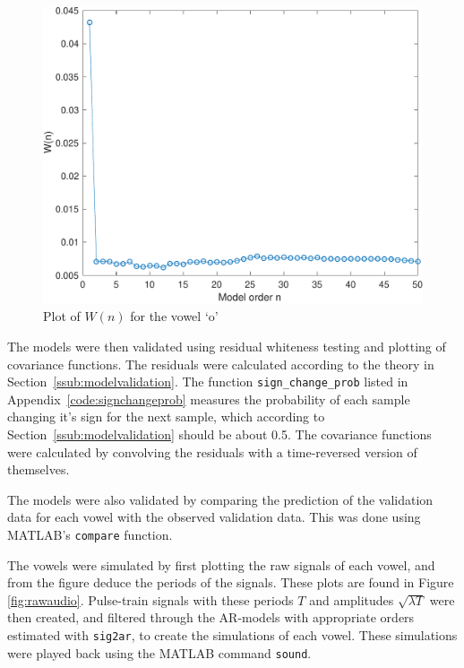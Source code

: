 \documentclass{IEEEtran}
\newcommand{\code}[1]{\texttt{#1}}
\begin{document}
\begin{figure}[h!]
    \centering
    \captionsetup{justification=centering}
    \includegraphics[width=0.8\columnwidth]{pictures/wno.pdf}
    \caption{Plot of $W(n)$ for the vowel `o'}
    \label{fig:wno}
\end{figure}

The models were then validated using residual whiteness testing and plotting of
covariance functions. The residuals were calculated according to the theory in
Section~\ref{ssub:modelvalidation}. The function \code{sign\_change\_prob}
listed in Appendix~\ref{code:signchangeprob}
measures the probability of each sample changing it's sign for the next
sample, which according to Section~\ref{ssub:modelvalidation} should be about
0.5. The covariance functions were calculated by convolving the residuals with
a time-reversed version of themselves.

The models were also validated by comparing the prediction of the validation
data for each vowel with the observed validation data. This was
done using MATLAB's \code{compare} function.

The vowels were simulated by first plotting the raw signals of each vowel, and
from the figure deduce the periods of the signals. These plots are found in
Figure \ref{fig:rawaudio}. Pulse-train signals with these
periods $T$ and amplitudes $\sqrt{\lambda T}$ were then created,
and filtered through the AR-models with appropriate
orders estimated with \code{sig2ar}, to create the simulations of each vowel.
These simulations were played back using the MATLAB command \code{sound}.
\end{document}
